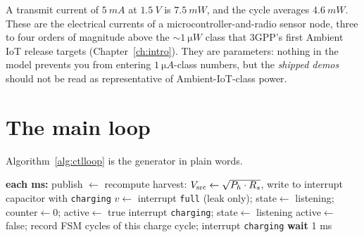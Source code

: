 \begin{reality}
A transmit current of $\SI{5}{mA}$ at $\SI{1.5}{V}$ is $\SI{7.5}{mW}$, and the cycle averages $\SI{4.6}{mW}$. These are the electrical currents of a microcontroller-and-radio sensor node, three to four orders of magnitude above the $\sim\SI{1}{\micro W}$ class that 3GPP's first Ambient IoT release targets (Chapter~\ref{ch:intro}). They are parameters: nothing in the model prevents you from entering $\SI{1}{\micro A}$-class numbers, but the \emph{shipped demos} should not be read as representative of Ambient-IoT-class power.
\end{reality}

\section{The main loop}
\label{sec:ctlloop}

Algorithm~\ref{alg:ctlloop} is the  generator in plain words.

\begin{algorithm}[t]
\caption{Controller main loop (every millisecond)}
\label{alg:ctlloop}
\begin{algorithmic}[1]
\State \textbf{each ms:} \quad publish $\gets$ 
\State recompute harvest:  \quad {}
\State $V_{\mathrm{src}}\gets\sqrt{P_h\cdot R_s}$, \quad write to 
   \State interrupt capacitor with \texttt{charging}
\Else
   \State $v\gets$ 
      \State interrupt \texttt{full} (leak only); state$\gets$ listening; counter$\gets0$; active$\gets$ true
      \State interrupt \texttt{charging}; state$\gets$ listening
      \State {} 
   \Else {}
      \State active$\gets$ false; record FSM cycles of this charge cycle; interrupt \texttt{charging}
   \EndIf
\EndIf
\State \textbf{wait} 1 ms
\end{algorithmic}
\end{algorithm}


